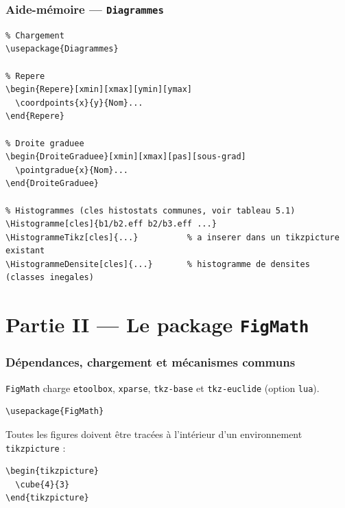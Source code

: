 \documentclass[11pt,a4paper]{article}
\newcommand{\pkg}[1]{\texttt{#1}}
\begin{document}
\section{Aide-mémoire --- \texttt{Diagrammes}}

\begin{lstlisting}
% Chargement
\usepackage{Diagrammes}

% Repere
\begin{Repere}[xmin][xmax][ymin][ymax]
  \coordpoints{x}{y}{Nom}...
\end{Repere}

% Droite graduee
\begin{DroiteGraduee}[xmin][xmax][pas][sous-grad]
  \pointgradue{x}{Nom}...
\end{DroiteGraduee}

% Histogrammes (cles histostats communes, voir tableau 5.1)
\Histogramme[cles]{b1/b2.eff b2/b3.eff ...}
\HistogrammeTikz[cles]{...}          % a inserer dans un tikzpicture existant
\HistogrammeDensite[cles]{...}       % histogramme de densites (classes inegales)
\end{lstlisting}

\part*{Partie II --- Le package \texttt{FigMath}}

\section{Dépendances, chargement et mécanismes communs}

\pkg{FigMath} charge \pkg{etoolbox}, \pkg{xparse}, \pkg{tkz-base} et \pkg{tkz-euclide} (option \texttt{lua}).

\begin{lstlisting}
\usepackage{FigMath}
\end{lstlisting}

Toutes les figures doivent être tracées à l'intérieur d'un environnement \texttt{tikzpicture} :

\begin{lstlisting}
\begin{tikzpicture}
  \cube{4}{3}
\end{tikzpicture}
\end{lstlisting}
\end{document}
